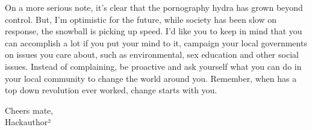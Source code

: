 \documentclass[easypeasy.tex]{subfiles}
\begin{document}
On a more serious note, it's clear that the pornography hydra has grown beyond control. But, I'm optimistic for the future, while society has been slow on response, the snowball is picking up speed. I'd like you to keep in mind that you can accomplish a lot if you put your mind to it, campaign your local governments on issues you care about, such as environmental, sex education and other social issues. Instead of complaining, be proactive and ask yourself what you can do in your local community to change the world around you. Remember, when has a top down revolution ever worked, change starts with you.

Cheers mate,\\
Hackauthor²
\end{document}
